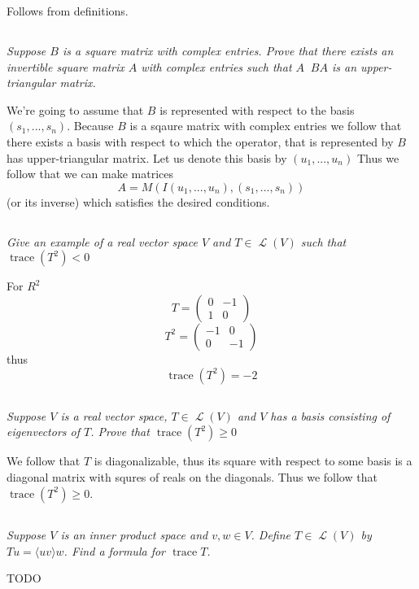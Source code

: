 \documentclass[11pt,oneside,titlepage]{book}
\DeclareMathOperator \map {\mathcal {L}}
\DeclareMathOperator \trace {trace}
\DeclareMathOperator \inv {^{-1}}
\newcommand{\eangle}[1]{\langle #1 \rangle}
\begin{document}
Follows from definitions.

\subsection{}

\textit{Suppose $B$ is a square matrix with complex entries. Prove that there exists an
  invertible square matrix $A$ with complex entries such that
  $A \inv B A$ is an upper-triangular matrix.}

We're going to assume that $B$ is represented with respect to the basis $(s_1, ..., s_n)$.
Because $B$ is a sqaure matrix with complex entries we follow that there exists a basis with
respect to which the operator, that is represented by $B$ has upper-triangular matrix.
Let us denote this basis by $(u_1, ..., u_n)$ 
Thus we follow that we can make matrices
$$A = M(I(u_1, ..., u_n), (s_1, ..., s_n))$$
(or its inverse) which satisfies the desired conditions.

\subsection{}

\textit{Give an example of a real vector space $V$ and $T \in \map(V)$ such that
  $\trace(T^2) < 0$}

For $R^2$
$$T =
\begin{pmatrix}
  0 & -1 \\
  1 & 0
\end{pmatrix}
$$
$$T^2 =
\begin{pmatrix}
  -1 & 0 \\
  0 & -1
\end{pmatrix}
$$
thus
$$\trace(T^2) = -2$$


\subsection{}

\textit{Suppose $V$ is a real vector space, $T \in \map(V)$ and $V$ has a basis consisting
  of eigenvectors of $T$. Prove that $\trace(T^2) \geq 0$}

We follow that $T$ is diagonalizable, thus its square with respect to some basis is
a diagonal matrix with squres of reals on the diagonals. Thus we follow that
$\trace(T^2) \geq 0$.

\subsection{}

\textit{Suppose $V$ is an inner product space and $v, w \in V$. Define $T \in \map(V)$
  by $Tu = \eangle{u v}w$. Find a formula for $\trace T$.}

TODO
\end{document}
